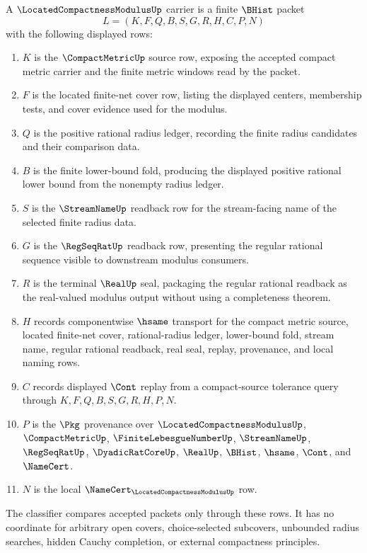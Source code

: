 \begin{definition}
\label{def:located-compactness-modulus-carrier}
A $\LocatedCompactnessModulusUp$ carrier is a finite $\BHist$ packet
$$
L=(K,F,Q,B,S,G,R,H,C,P,N)
$$
with the following displayed rows:
\begin{enumerate}
\item $K$ is the $\CompactMetricUp$ source row, exposing the accepted compact metric carrier and the finite metric windows read by the packet.
\item $F$ is the located finite-net cover row, listing the displayed centers, membership tests, and cover evidence used for the modulus.
\item $Q$ is the positive rational radius ledger, recording the finite radius candidates and their comparison data.
\item $B$ is the finite lower-bound fold, producing the displayed positive rational lower bound from the nonempty radius ledger.
\item $S$ is the $\StreamNameUp$ readback row for the stream-facing name of the selected finite radius data.
\item $G$ is the $\RegSeqRatUp$ readback row, presenting the regular rational sequence visible to downstream modulus consumers.
\item $R$ is the terminal $\RealUp$ seal, packaging the regular rational readback as the real-valued modulus output without using a completeness theorem.
\item $H$ records componentwise $\hsame$ transport for the compact metric source, located finite-net cover, rational-radius ledger, lower-bound fold, stream name, regular rational readback, real seal, replay, provenance, and local naming rows.
\item $C$ records displayed $\Cont$ replay from a compact-source tolerance query through $K,F,Q,B,S,G,R,H,P,N$.
\item $P$ is the $\Pkg$ provenance over $\LocatedCompactnessModulusUp$, $\CompactMetricUp$, $\FiniteLebesgueNumberUp$, $\StreamNameUp$, $\RegSeqRatUp$, $\DyadicRatCoreUp$, $\RealUp$, $\BHist$, $\hsame$, $\Cont$, and $\NameCert$.
\item $N$ is the local $\NameCert_{\LocatedCompactnessModulusUp}$ row.
\end{enumerate}
The classifier compares accepted packets only through these rows. It has no coordinate for arbitrary open covers, choice-selected subcovers, unbounded radius searches, hidden Cauchy completion, or external compactness principles.
\end{definition}

